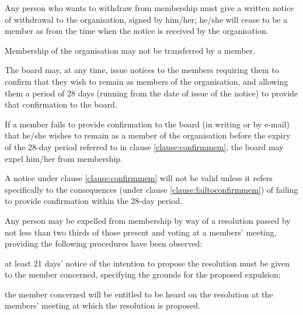 ﻿\documentclass[a4paper,11pt,onecolumn ]{article}
\begin{document}
\begin{legal}
\item Any person who wants to withdraw from membership must give a written notice of withdrawal to the organisation, signed by him/her; he/she will cease to be a member as from the time when the notice is received by the organisation.
\end{legal}

\begin{legal}
\item Membership of the organisation may not be transferred by a member.
\end{legal}

\begin{legal}
\item \label{clause:confirmmem} The board may, at any time, issue notices to the members requiring them to confirm that they wish to remain as members of the organisation, and allowing them a period of 28 days (running from the date of issue of the notice) to provide that confirmation to the board. 
\item \label{clause:failtoconfirmmem} If a member fails to provide confirmation to the board (in writing or by e-mail) that he/she wishes to remain as a member of the organisation before the expiry of the 28-day period referred to in clause \ref{clause:confirmmem}, the board may expel him/her from membership.

\item A notice under clause \ref{clause:confirmmem} will not be valid unless it refers specifically to the consequences (under clause \ref{clause:failtoconfirmmem}) of failing to provide confirmation within the 28-day period.
\end{legal}

\begin{legal}
\item \label{clause:expel_members} Any person may be expelled from membership by way of a resolution passed by not less than two thirds of those present and voting at a members' meeting, providing the following procedures have been observed:
    \begin{legal}
    \item at least 21 days’ notice of the intention to propose the resolution must be given to the member concerned, specifying the grounds for the proposed expulsion;
    \item the member concerned will be entitled to be heard on the resolution at the members' meeting at which the resolution is proposed.
    \end{legal}
\end{legal}
\end{document}
